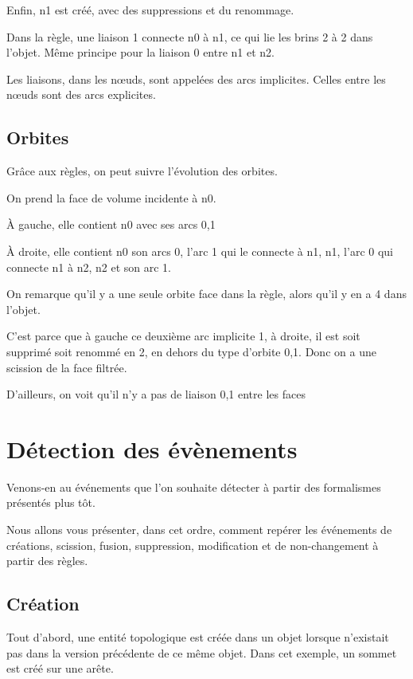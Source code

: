 \documentclass[a4paper]{article}
\begin{document}
Enfin, n1 est créé, avec des suppressions et du renommage.

Dans la règle, une liaison 1 connecte n0 à n1, ce qui lie les brins 2 à 2 dans l'objet.
Même principe pour la liaison 0 entre n1 et n2.

Les liaisons, dans les nœuds, sont appelées des arcs implicites.
Celles entre les nœuds sont des arcs explicites.

\subsection{Orbites}

Grâce aux règles, on peut suivre l'évolution des orbites.

On prend la face de volume incidente à n0.

À gauche, elle contient n0 avec ses arcs 0,1

À droite, elle contient n0 son arcs 0, l'arc 1 qui le connecte à
n1, n1, l'arc 0 qui connecte n1 à n2, n2 et son arc 1.

On remarque qu'il y a une seule orbite face dans la règle, alors qu'il y en a 4
dans l'objet. %

C'est parce que à gauche ce deuxième arc implicite 1, à droite, il est soit supprimé soit renommé en 2, en dehors du type d'orbite 0,1.
Donc on a une scission de la face filtrée. %

D'ailleurs, on voit qu'il n'y a pas de liaison 0,1 entre les faces



\section{Détection des évènements}



Venons-en au événements que l'on souhaite détecter à partir des formalismes
présentés plus tôt.

Nous allons vous présenter, dans cet ordre, comment repérer les événements de
créations, scission, fusion, suppression, modification et de non-changement à
partir des règles.

\subsection{Création}

Tout d'abord, une entité topologique est créée dans un objet lorsque n'existait
pas dans la version précédente de ce même objet.
Dans cet exemple, un sommet est créé sur une arête.
\end{document}
